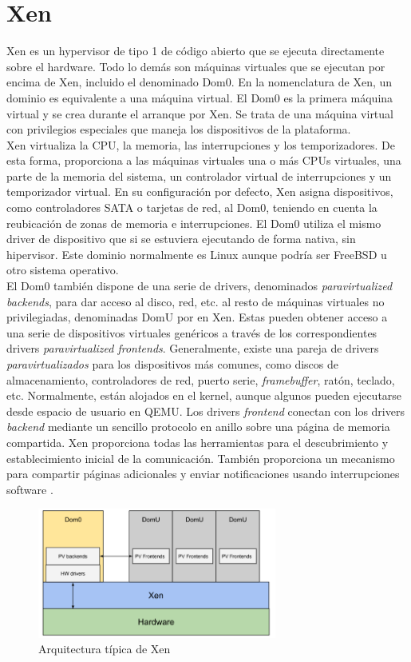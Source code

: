 \section{Xen}
Xen \cite{xen_arm_whitepaper} es un hypervisor de tipo 1 de código abierto que se ejecuta directamente sobre el hardware. Todo lo demás son máquinas virtuales que se ejecutan por encima de Xen, incluido el denominado Dom0. En la nomenclatura de Xen, un dominio es equivalente a una máquina virtual. El Dom0 es la primera máquina virtual y se crea durante el arranque por Xen. Se trata de una máquina virtual con privilegios especiales que maneja los dispositivos de la plataforma.\\[0.5cm]
Xen virtualiza la CPU, la memoria, las interrupciones y los temporizadores. De esta forma, proporciona a las máquinas virtuales una o más CPUs virtuales, una parte de la memoria del sistema, un controlador virtual de interrupciones y un temporizador virtual. En su configuración por defecto, Xen asigna dispositivos, como controladores SATA o tarjetas de red, al Dom0, teniendo en cuenta la reubicación de zonas de memoria e interrupciones. El Dom0 utiliza el mismo driver de dispositivo que si se estuviera ejecutando de forma nativa, sin hipervisor. Este dominio normalmente es Linux aunque podría ser FreeBSD u otro sistema operativo.\\[0.5cm]
El Dom0 también dispone de una serie de drivers, denominados \textit{paravirtualized backends}, para dar acceso al disco, red, etc. al resto de máquinas virtuales no privilegiadas, denominadas DomU por en Xen. Estas pueden obtener acceso a una serie de dispositivos virtuales genéricos a través de los correspondientes drivers \textit{paravirtualized frontends}. Generalmente, existe una pareja de drivers \textit{paravirtualizados} para los dispositivos más comunes, como discos de almacenamiento, controladores de red, puerto serie, \textit{framebuffer}, ratón, teclado, etc. Normalmente, están alojados en el kernel, aunque algunos pueden ejecutarse desde espacio de usuario en QEMU. Los drivers \textit{frontend} conectan con los drivers \textit{backend} mediante un sencillo protocolo en anillo sobre una página de memoria compartida. Xen proporciona todas las herramientas para el descubrimiento y establecimiento inicial de la comunicación. También proporciona un mecanismo para compartir páginas adicionales y enviar notificaciones usando interrupciones software \cite{xen_arm_whitepaper}.\\

\begin{figure}[!htb]
  \centering
  \includegraphics[width=0.70\textwidth]{recursos/xen_1.png}
  \caption{Arquitectura típica de Xen}
  \label{fig:xen_1}
\end{figure}

